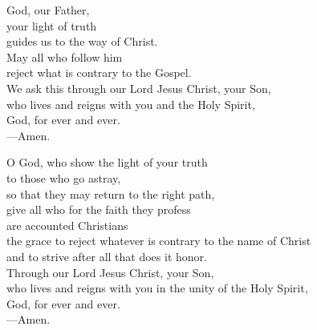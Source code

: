 \prayer


\begin{prayerverse}
God, our Father,\\
your light of truth\\
guides us to the way of Christ.\\
May all who follow him\\
reject what is contrary to the Gospel.\\
We ask this through our Lord Jesus Christ, your Son,\\
who lives and reigns with you and the Holy Spirit,\\
God, for ever and ever.\\
{\color{red}---\thinspace}Amen.
\end{prayerverse}


\begin{prayerverse}
O God, who show the light of your truth\\
to those who go astray,\\
so that they may return to the right path,\\
give all who for the faith they profess\\
are accounted Christians\\
the grace to reject whatever is contrary to the name of Christ\\
and to strive after all that does it honor.\\
Through our Lord Jesus Christ, your Son,\\
who lives and reigns with you in the unity of the Holy Spirit,\\
God, for ever and ever.\\
{\color{red}---\thinspace}Amen.
\end{prayerverse}

